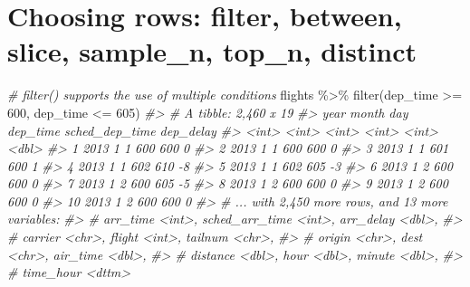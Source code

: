 \documentclass[
]{book}
\newenvironment{Shaded}{\begin{snugshade}}{\end{snugshade}}
\newcommand{\CommentTok}[1]{\textcolor[rgb]{0.56,0.35,0.01}{\textit{#1}}}
\newcommand{\DecValTok}[1]{\textcolor[rgb]{0.00,0.00,0.81}{#1}}
\newcommand{\FunctionTok}[1]{\textcolor[rgb]{0.00,0.00,0.00}{#1}}
\newcommand{\NormalTok}[1]{#1}
\newcommand{\SpecialCharTok}[1]{\textcolor[rgb]{0.00,0.00,0.00}{#1}}
\begin{document}
\hypertarget{choosing-rows-filter-between-slice-sample_n-top_n-distinct}{%
\section{Choosing rows: filter, between, slice, sample\_n, top\_n, distinct}\label{choosing-rows-filter-between-slice-sample_n-top_n-distinct}}

\begin{Shaded}
\begin{Highlighting}[]
\CommentTok{\# filter() supports the use of multiple conditions}
\NormalTok{flights }\SpecialCharTok{\%\textgreater{}\%} \FunctionTok{filter}\NormalTok{(dep\_time }\SpecialCharTok{\textgreater{}=} \DecValTok{600}\NormalTok{, dep\_time }\SpecialCharTok{\textless{}=} \DecValTok{605}\NormalTok{)}
\CommentTok{\#\textgreater{} \# A tibble: 2,460 x 19}
\CommentTok{\#\textgreater{}     year month   day dep\_time sched\_dep\_time dep\_delay}
\CommentTok{\#\textgreater{}    \textless{}int\textgreater{} \textless{}int\textgreater{} \textless{}int\textgreater{}    \textless{}int\textgreater{}          \textless{}int\textgreater{}     \textless{}dbl\textgreater{}}
\CommentTok{\#\textgreater{}  1  2013     1     1      600            600         0}
\CommentTok{\#\textgreater{}  2  2013     1     1      600            600         0}
\CommentTok{\#\textgreater{}  3  2013     1     1      601            600         1}
\CommentTok{\#\textgreater{}  4  2013     1     1      602            610        {-}8}
\CommentTok{\#\textgreater{}  5  2013     1     1      602            605        {-}3}
\CommentTok{\#\textgreater{}  6  2013     1     2      600            600         0}
\CommentTok{\#\textgreater{}  7  2013     1     2      600            605        {-}5}
\CommentTok{\#\textgreater{}  8  2013     1     2      600            600         0}
\CommentTok{\#\textgreater{}  9  2013     1     2      600            600         0}
\CommentTok{\#\textgreater{} 10  2013     1     2      600            600         0}
\CommentTok{\#\textgreater{} \# ... with 2,450 more rows, and 13 more variables:}
\CommentTok{\#\textgreater{} \#   arr\_time \textless{}int\textgreater{}, sched\_arr\_time \textless{}int\textgreater{}, arr\_delay \textless{}dbl\textgreater{},}
\CommentTok{\#\textgreater{} \#   carrier \textless{}chr\textgreater{}, flight \textless{}int\textgreater{}, tailnum \textless{}chr\textgreater{},}
\CommentTok{\#\textgreater{} \#   origin \textless{}chr\textgreater{}, dest \textless{}chr\textgreater{}, air\_time \textless{}dbl\textgreater{},}
\CommentTok{\#\textgreater{} \#   distance \textless{}dbl\textgreater{}, hour \textless{}dbl\textgreater{}, minute \textless{}dbl\textgreater{},}
\CommentTok{\#\textgreater{} \#   time\_hour \textless{}dttm\textgreater{}}
\end{Highlighting}
\end{Shaded}
\end{document}

